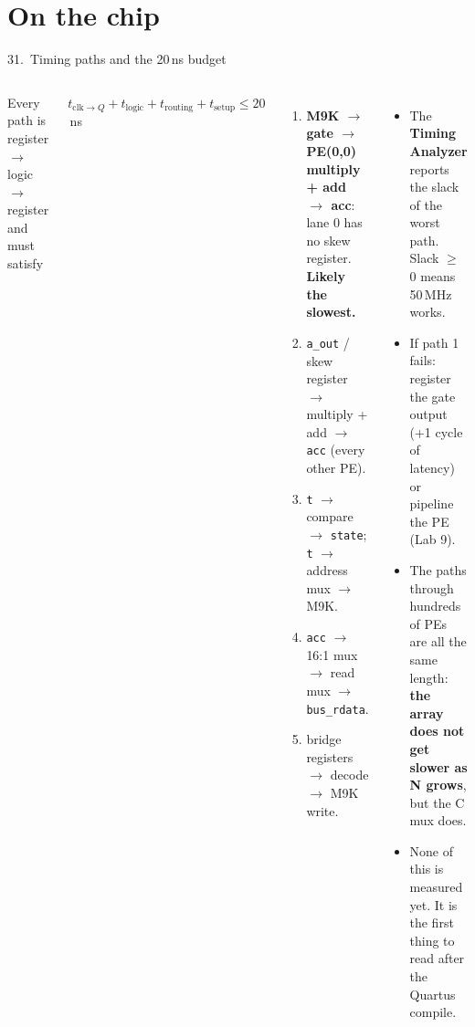 \documentclass[aspectratio=169,11pt]{beamer}
\newcommand{\sig}[1]{\texttt{#1}}
\begin{document}
\section{On the chip}
\begin{frame}{31.\ Timing paths and the 20\,ns budget}
  \begin{columns}[T]
    \small
    Every path is register $\rightarrow$ logic $\rightarrow$ register and must satisfy\\[1mm]
    \centerline{$t_{\text{clk}\rightarrow Q} + t_{\text{logic}} + t_{\text{routing}} + t_{\text{setup}} \le 20$\,ns}
    \vspace{1mm}
    \begin{enumerate}
      \item \textbf{M9K $\rightarrow$ gate $\rightarrow$ PE(0,0) multiply + add $\rightarrow$ acc}: lane 0 has no skew
            register. \textcolor{copper}{\textbf{Likely the slowest.}}
      \item \sig{a\_out} / skew register $\rightarrow$ multiply + add $\rightarrow$ \sig{acc} (every other PE).
      \item \sig{t} $\rightarrow$ compare $\rightarrow$ \sig{state}; \sig{t} $\rightarrow$ address mux $\rightarrow$ M9K.
      \item \sig{acc} $\rightarrow$ 16:1 mux $\rightarrow$ read mux $\rightarrow$ \sig{bus\_rdata}.
      \item bridge registers $\rightarrow$ decode $\rightarrow$ M9K write.
    \end{enumerate}
    \small
    \begin{itemize}
      \item The \textbf{Timing Analyzer} reports the slack of the worst path. Slack $\ge$ 0 means 50\,MHz works.
      \item If path 1 fails: register the gate output (+1 cycle of latency) or pipeline the PE (Lab 9).
      \item The paths through hundreds of PEs are all the same length: \textbf{the array does not get slower as N grows},
            but the C mux does.
      \item None of this is measured yet. It is the first thing to read after the Quartus compile.
    \end{itemize}
  \end{columns}
\end{frame}
\end{document}
